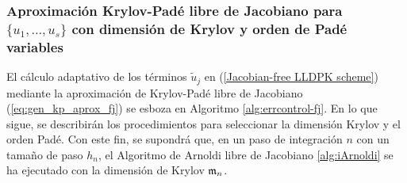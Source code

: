 \subsubsection{Aproximación Krylov-Padé libre de Jacobiano para $\{ u_1,\ldots, u_s \}$ con dimensión de Krylov y orden de Padé variables}

El cálculo adaptativo de los términos $\widetilde{u}_j$ en (\ref{Jacobian-free LLDPK scheme}) mediante la aproximación de Krylov-Padé libre de Jacobiano (\ref{eq:gen_kp_aprox_fj}) se esboza en Algoritmo \ref{alg:errcontrol-fj}. En lo que sigue, se describirán los procedimientos para seleccionar la dimensión Krylov y el orden Padé. Con este fin, se supondrá que, en un paso de integración $n$ con un tamaño de paso $h_n$, el Algoritmo de Arnoldi libre de Jacobiano \ref{alg:iArnoldi} se ha ejecutado con la dimensión de Krylov $\mathfrak{m}_n$.

